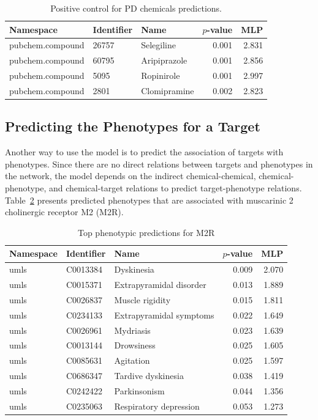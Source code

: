 \begin{table}
\centering
\begin{tabular}{|l|l|l|r|r|}
\hline
 \textbf{Namespace} & \textbf{Identifier} & \textbf{Name} & \textbf{$p$-value} & \textbf{MLP} \\
\hline
pubchem.compound & 26757 & Selegiline & 0.001 & 2.831 \\
\hline
pubchem.compound & 60795 &  Aripiprazole &  0.001 &  2.856 \\
\hline
pubchem.compound & 5095 & Ropinirole &  0.001 &  2.997 \\
\hline
pubchem.compound & 2801 & Clomipramine &  0.002 &  2.823 \\
\hline
\end{tabular}
 \caption{Positive control for PD chemicals predictions.}
    \label{tab:ps_PD}
\end{table}

\subsection{Predicting the Phenotypes for a Target }
Another way to use the model is to predict the association of targets with phenotypes.
Since there are no direct relations between targets and phenotypes in the network, the model depends on the indirect chemical-chemical, chemical-phenotype, and chemical-target relations to predict target-phenotype relations.
Table~\ref{tab:target_phenotype} presents predicted phenotypes that are associated with muscarinic 2 cholinergic receptor M2 (M2R).

\begin{table}[h]
    \centering
    \begin{tabular}{ |l|l|l|r|r| } 
        \hline
        \textbf{Namespace} & \textbf{Identifier} & \textbf{Name} & \textbf{$p$-value} & \textbf{MLP} \\
        \hline
        umls & C0013384 & Dyskinesia &  0.009 &  2.070 \\
        \hline
        umls & C0015371 & Extrapyramidal disorder &  0.013 &  1.889 \\
        \hline
        umls & C0026837 & Muscle rigidity &  0.015 &  1.811 \\
        \hline
        umls & C0234133 & Extrapyramidal symptoms &  0.022 &  1.649 \\
        \hline
        umls &  C0026961 & Mydriasis &  0.023 &  1.639 \\
        \hline
        umls & C0013144 & Drowsiness &  0.025 &  1.605 \\
        \hline
        umls &  C0085631 & Agitation &  0.025 &  1.597 \\
        \hline
        umls &  C0686347 & Tardive dyskinesia &  0.038 &  1.419 \\
        \hline
        umls &  C0242422 & Parkinsonism &  0.044 &  1.356 \\
        \hline
        umls &  C0235063 & Respiratory depression &  0.053 &  1.273 \\
        \hline
    \end{tabular}
    \caption{Top phenotypic predictions for M2R}
    \label{tab:target_phenotype}
\end{table}

